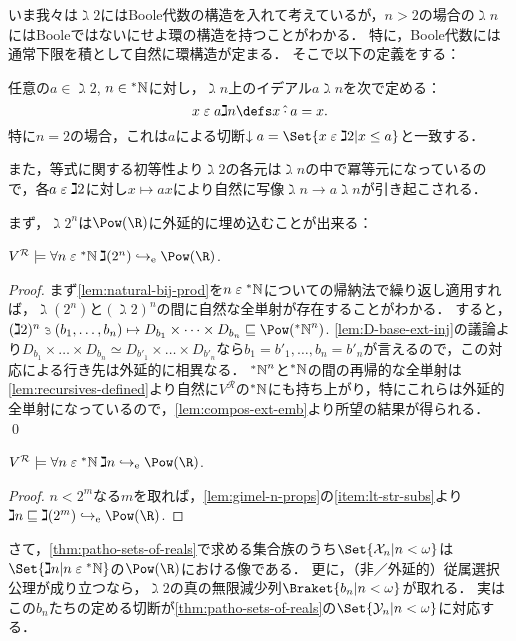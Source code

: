 \documentclass[realisability.tex]{subfiles}
\begin{document}
いま我々は$\gimel 2$にはBoole代数の構造を入れて考えているが，$n > 2$の場合の$\gimel n$にはBooleではないにせよ環の構造を持つことがわかる．
特に，Boole代数には通常下限を積として自然に環構造が定まる．
そこで以下の定義をする：

\begin{definition}
 任意の$a \in \gimel 2$, $n \in \mathord{{}^{*}\mathbb{N}}$に対し，$\gimel n$上のイデアル$a\gimel n$を次で定める：
 \[
  x \strin a \gimel n \defs x \mathbin{\hat{\cdot}} a = x.
 \]
 特に$n = 2$の場合，これは$a$による切断$\downarrow a = \Set{x \strin \gimel 2| x \leq a}$と一致する．

 また，等式に関する初等性より$\gimel 2$の各元は$\gimel n$の中で冪等元になっているので，各$a \mathrel{\varepsilon} \gimel 2$に対し$x \mapsto a x$により自然に写像$\gimel n \to a \gimel n$が引き起こされる．
\end{definition}

まず，$\gimel 2^n$は$\Pow(\R)$に外延的に埋め込むことが出来る：
\begin{lemma}
 $V^{\mathcal{R}} \models \forall n \strin \NN \: \gimel(2^n) \eembto \Pow(\R)$.
\end{lemma}
\begin{proof}
 まず\cref{lem:natural-bij-prod}を$n \mathrel{\varepsilon} \mathord{{}^{*}\mathbb{N}}$についての帰納法で繰り返し適用すれば，$\gimel(2^n)$と$(\gimel 2)^n$の間に自然な全単射が存在することがわかる．
 すると，$(\gimel 2)^n \strni (b_1, \dots, b_n) \mapsto D_{b_1} \times \dots \times D_{b_n} \sqsubseteq \Pow(\NN^n)$.
 \cref{lem:D-base-ext-inj}の議論より$D_{b_1} \times \dots \times D_{b_n} \simeq D_{b'_1} \times \dots \times D_{b'_n}$なら$b_1 = b'_1, \dots, b_n = b'_n$が言えるので，この対応による行き先は外延的に相異なる．
 $\mathord{{}^{*}\mathbb{N}}^n$と$\mathord{{}^{*}\mathbb{N}}$の間の再帰的な全単射は\cref{lem:recursives-defined}より自然に$V^{\mathcal{R}}$の$\mathord{{}^{*}\mathbb{N}}$にも持ち上がり，特にこれらは外延的全単射になっているので，\cref{lem:compos-ext-emb}より所望の結果が得られる． \qed
\end{proof}

\begin{corollary}\label{cor:gimels-ext-embeds}
 $V^{\mathcal{R}} \models \forall n \strin \NN\: \gimel n \eembto \Pow(\R)$.
\end{corollary}
\begin{proof}
 $n < 2^m$なる$m$を取れば，\cref{lem:gimel-n-props}の\ref{item:lt-str-subs}より$\gimel n \sqsubseteq \gimel (2^m) \eembto \Pow(\R)$.
\end{proof}
さて，\cref{thm:patho-sets-of-reals}で求める集合族のうち$\Set{\mathcal{X}_n | n < \omega}$は$\Set{\gimel n | n \strin \NN}$の$\Pow(\R)$における像である．
更に，（非／外延的）従属選択公理が成り立つなら，$\gimel 2$の真の無限減少列$\Braket{b_n | n < \omega}$が取れる．
実はこの$b_n$たちの定める切断が\cref{thm:patho-sets-of-reals}の$\Set{\mathcal{Y}_n | n < \omega}$に対応する．
\end{document}
